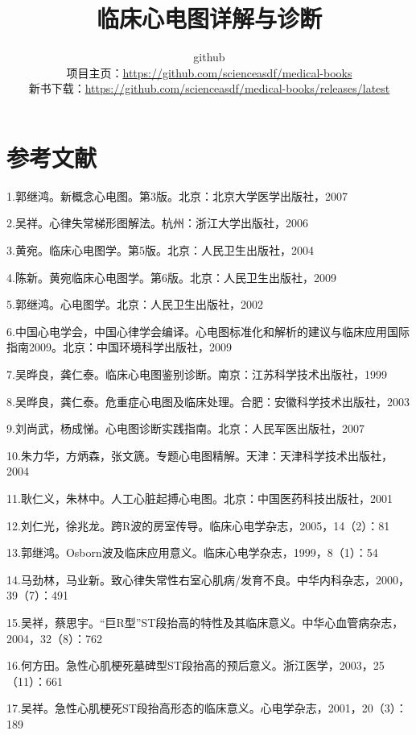 \documentclass[
  12pt,
  twoside,
  banjiao]{ctexbook}
\title{临床心电图详解与诊断}
\author{github \\ 项目主页：\url{https://github.com/scienceasdf/medical-books}\\ 新书下载：\url{https://github.com/scienceasdf/medical-books/releases/latest}}
\begin{document}
\maketitle
\frontmatter
{
\setcounter{tocdepth}{1}
\tableofcontents
{}
}
\newpage

\mainmatter





\appendix
\part{参考文献}

1.郭继鸿。新概念心电图。第3版。北京：北京大学医学出版社，2007

2.吴祥。心律失常梯形图解法。杭州：浙江大学出版社，2006

3.黄宛。临床心电图学。第5版。北京：人民卫生出版社，2004

4.陈新。黄宛临床心电图学。第6版。北京：人民卫生出版社，2009

5.郭继鸿。心电图学。北京：人民卫生出版社，2002

6.中国心电学会，中国心律学会编译。心电图标准化和解析的建议与临床应用国际指南2009。北京：中国环境科学出版社，2009

7.吴晔良，龚仁泰。临床心电图鉴别诊断。南京：江苏科学技术出版社，1999

8.吴晔良，龚仁泰。危重症心电图及临床处理。合肥：安徽科学技术出版社，2003

9.刘尚武，杨成悌。心电图诊断实践指南。北京：人民军医出版社，2007

10.朱力华，方炳森，张文篪。专题心电图精解。天津：天津科学技术出版社，2004

11.耿仁义，朱林中。人工心脏起搏心电图。北京：中国医药科技出版社，2001

12.刘仁光，徐兆龙。跨R波的房室传导。临床心电学杂志，2005，14（2）：81

13.郭继鸿。Osborn波及临床应用意义。临床心电学杂志，1999，8（1）：54

14.马劲林，马业新。致心律失常性右室心肌病/发育不良。中华内科杂志，2000，39（7）：491

15.吴祥，蔡思宇。“巨R型”ST段抬高的特性及其临床意义。中华心血管病杂志，2004，32（8）：762

16.何方田。急性心肌梗死墓碑型ST段抬高的预后意义。浙江医学，2003，25（11）：661

17.吴祥。急性心肌梗死ST段抬高形态的临床意义。心电学杂志，2001，20（3）：189
\end{document}
